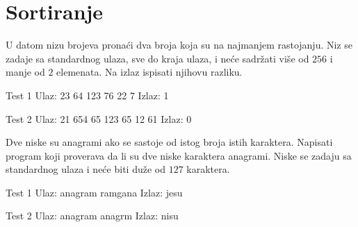 \section{Sortiranje}


\begin{Exercise}[label=501]
  U datom nizu brojeva pronaći dva broja koja su na najmanjem
  rastojanju. Niz se zadaje sa standardnog ulaza, sve do kraja ulaza,
  i neće sadržati više od $256$ i manje od $2$ elemenata. Na izlaz
  ispisati njihovu razliku.  
  
\begin{miditest}
\begin{test}{Test 1}
Ulaz:   23 64 123 76 22 7
Izlaz:  1
\end{test}
\end{miditest}
\begin{miditest}
\begin{test}{Test 2}
Ulaz:   21 654 65 123 65 12 61
Izlaz:  0
\end{test}
\end{miditest}
  
\end{Exercise}

\begin{Answer}[ref=501]
\end{Answer}
\begin{Exercise}[label=502]
  Dve niske su anagrami ako se sastoje od istog broja istih
  karaktera. Napisati program koji proverava da li su dve niske
  karaktera anagrami.  Niske se zadaju sa standardnog ulaza i neće
  biti duže od $127$ karaktera.  
  
\begin{miditest}
\begin{test}{Test 1}
Ulaz:   anagram ramgana
Izlaz:  jesu
\end{test}
\end{miditest}
\begin{miditest}
\begin{test}{Test 2}
Ulaz:   anagram anagrm
Izlaz:  nisu
\end{test}
\end{miditest}
  
\end{Exercise}

